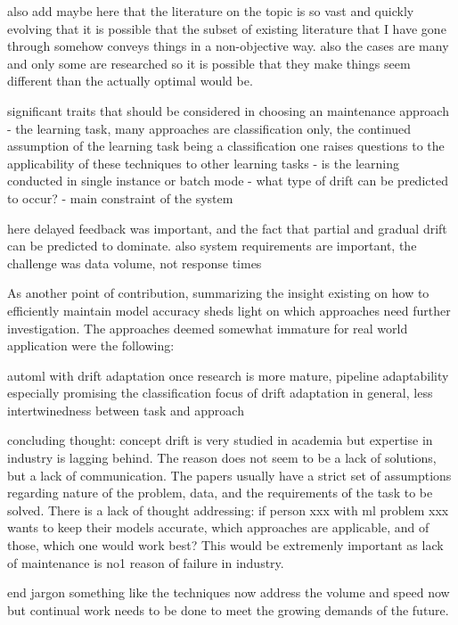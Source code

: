 also add maybe here that the literature on the topic is so vast and quickly evolving that it is possible that the subset of existing literature that I have gone through somehow conveys things in a non-objective way. also the cases are many and only some are researched so it is possible that they make things seem different than the actually optimal would be.

significant traits that should be considered in choosing an maintenance approach
 - the learning task, many approaches are classification only, the continued assumption of the learning task being a classification one raises questions to the applicability of these techniques to other learning tasks
 - is the learning conducted in single instance or batch mode
 - what type of drift can be predicted to occur?
 - main constraint of the system
 
 here delayed feedback was important, and the fact that partial and gradual drift can be predicted to dominate. also system requirements are important, the challenge was data volume, not response times
 
 As another point of contribution, summarizing the insight existing on how to efficiently maintain model accuracy sheds light on which approaches need further investigation. The approaches deemed somewhat immature for real world application were the following:
 
 automl with drift adaptation once research is more mature, pipeline adaptability especially promising
 the classification focus of drift adaptation in general, less intertwinedness between task and approach
 
 concluding thought: concept drift is very studied in academia but expertise in industry is lagging behind. The reason does not seem to be a lack of solutions, but a lack of communication. The papers usually have a strict set of assumptions regarding nature of the problem, data, and the requirements of the task to be solved. There is a lack of thought addressing: if person xxx with ml problem xxx wants to keep their models accurate, which approaches are applicable, and of those, which one would work best? This would be extremenly important as lack of maintenance is no1 reason of failure in industry.
 
 end jargon something like the techniques now address the volume and speed now but continual work needs to be done to meet the growing demands of the future.
